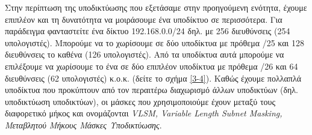 Στην περίπτωση της υποδικτύωσης που εξετάσαμε στην προηγούμενη ενότητα, έχουμε επιπλέον και τη δυνατότητα να μοιράσουμε ένα υποδίκτυο σε περισσότερα. Για παράδειγμα φανταστείτε ένα δίκτυο 192.168.0.0/24 δηλ. με 256 διευθύνσεις (254 υπολογιστές). Μπορούμε να το χωρίσουμε σε δύο υποδίκτυα με πρόθεμα /25 και 128 διευθύνσεις το καθένα (126 υπολογιστές). Από τα υποδίκτυα αυτά μπορούμε να επιλέξουμε να χωρίσουμε το ένα σε δύο επιπλέον υποδίκτυα με πρόθεμα /26 και 64 διευθύνσεις (62 υπολογιστές) κ.ο.κ. (δείτε το σχήμα \ref{3-4}). Καθώς έχουμε πολλαπλά υποδίκτυα που προκύπτουν από τον περαιτέρω διαχωρισμό άλλων υποδικτύων (δηλ. υποδικτύωση υποδικτύων), οι μάσκες που χρησιμοποιούμε έχουν μεταξύ τους διαφορετικό μήκος και ονομάζονται \emph{VLSM, Variable Length Subnet Masking, Μεταβλητού Μήκους Μάσκες Υποδικτύωσης}.